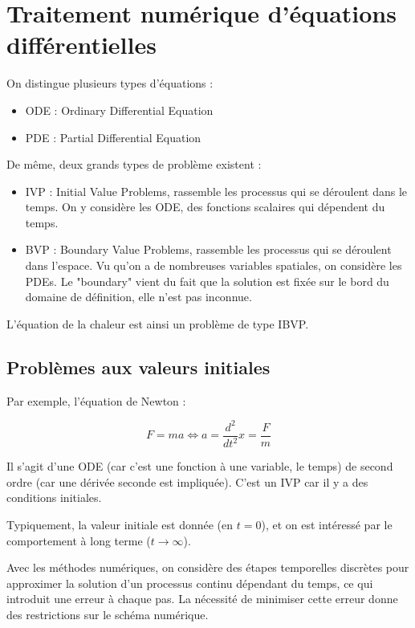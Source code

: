 \chapter{Traitement numérique d'équations différentielles}

On distingue plusieurs types d'équations :

\begin{itemize}
	\item ODE : Ordinary Differential Equation
	\item PDE : Partial Differential Equation
\end{itemize}

De même, deux grands types de problème existent :

\begin{itemize}
	\item IVP : Initial Value Problems, rassemble les processus qui se déroulent dans le temps. On y considère les ODE, des fonctions scalaires qui dépendent du temps.
	\item BVP : Boundary Value Problems, rassemble les processus qui se déroulent dans l'espace. Vu qu'on a de nombreuses variables spatiales, on considère les PDEs. Le "boundary" vient du fait que la solution est fixée sur le bord du domaine de définition, elle n'est pas inconnue.
\end{itemize}

L'équation de la chaleur est ainsi un problème de type IBVP.

\section{Problèmes aux valeurs initiales}

Par exemple, l'équation de Newton :

$$F = ma \Leftrightarrow a = \frac{d^2}{dt^2}x = \frac{F}{m}$$

Il s'agit d'une ODE (car c'est une fonction à une variable, le temps) de second ordre (car une dérivée seconde est impliquée). C'est un IVP car il y a des conditions initiales.

Typiquement, la valeur initiale est donnée (en $t = 0$), et on est intéressé par le comportement à long terme ($t \rightarrow \infty$).

Avec les méthodes numériques, on considère des étapes temporelles discrètes pour approximer la solution d'un processus continu dépendant du temps, ce qui introduit une erreur à chaque pas. La nécessité de minimiser cette erreur donne des restrictions sur le schéma numérique.

